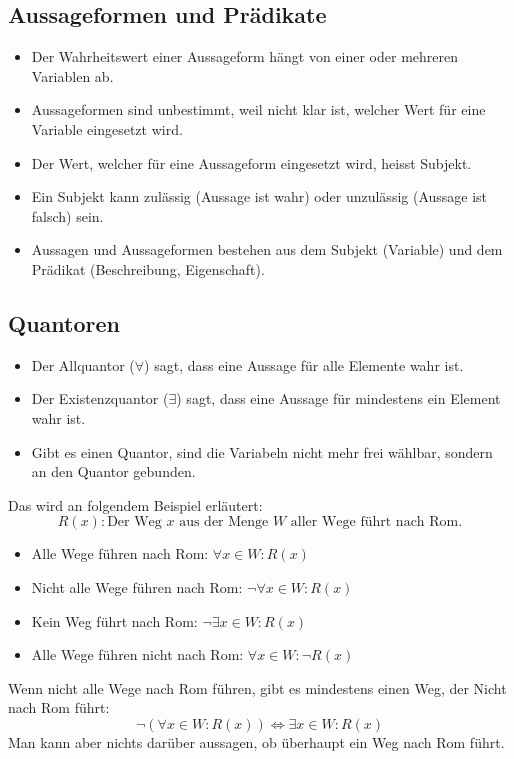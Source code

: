 \subsection{Aussageformen und Prädikate}
  \begin{itemize}
    \item Der Wahrheitswert einer Aussageform hängt von einer oder mehreren Variablen ab.
    \item Aussageformen sind unbestimmt, weil nicht klar ist, welcher Wert für eine Variable eingesetzt wird.
    \item Der Wert, welcher für eine Aussageform eingesetzt wird, heisst Subjekt.
    \item Ein Subjekt kann zulässig (Aussage ist wahr) oder unzulässig (Aussage ist falsch) sein.
    \item Aussagen und Aussageformen bestehen aus dem Subjekt (Variable) und dem Prädikat (Beschreibung, Eigenschaft).
  \end{itemize}

\subsection{Quantoren}
  \begin{itemize}
    \item Der Allquantor ($\forall$) sagt, dass eine Aussage für alle Elemente wahr ist.
    \item Der Existenzquantor ($\exists$) sagt, dass eine Aussage für mindestens ein Element wahr ist.
    \item Gibt es einen Quantor, sind die Variabeln nicht mehr frei wählbar, sondern an den Quantor gebunden.
  \end{itemize}
  Das wird an folgendem Beispiel erläutert: \[R(x) : \text{Der Weg } x \text{ aus der Menge } W \text{ aller Wege führt nach Rom.} \]
  \begin{itemize}
    \item Alle Wege führen nach Rom: $\forall x \in W: R(x)$
    \item Nicht alle Wege führen nach Rom: $\neg \forall x \in W: R(x)$
    \item Kein Weg führt nach Rom: $\neg \exists x \in W: R(x)$
    \item Alle Wege führen nicht nach Rom: $\forall x \in W: \neg R(x)$
  \end{itemize}
  Wenn nicht alle Wege nach Rom führen, gibt es mindestens einen Weg, der Nicht nach Rom führt:
  \[ \neg (\forall x \in W: R(x)) \Leftrightarrow \exists x \in W: R(x) \]
  Man kann aber nichts darüber aussagen, ob überhaupt ein Weg nach Rom führt.


